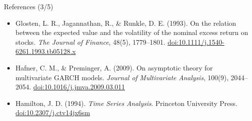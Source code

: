 \begin{frame}{References (3/5)}
\begin{itemize}
    \item Glosten, L. R., Jagannathan, R., \& Runkle, D. E. (1993). On the relation between the expected value and the volatility of the nominal excess return on stocks. \textit{The Journal of Finance}, 48(5), 1779--1801. \href{https://doi.org/10.1111/j.1540-6261.1993.tb05128.x}{doi:10.1111/j.1540-6261.1993.tb05128.x}
    \item Hafner, C. M., \& Preminger, A. (2009). On asymptotic theory for multivariate GARCH models. \textit{Journal of Multivariate Analysis}, 100(9), 2044--2054. \href{https://doi.org/10.1016/j.jmva.2009.03.011}{doi:10.1016/j.jmva.2009.03.011}
    \item Hamilton, J. D. (1994). \textit{Time Series Analysis}. Princeton University Press. \href{https://doi.org/10.2307/j.ctv14jx6sm}{doi:10.2307/j.ctv14jx6sm}
\end{itemize}
\end{frame}


